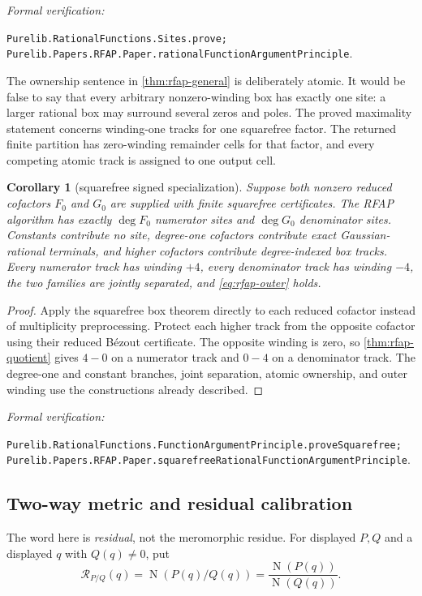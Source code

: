 \documentclass[11pt]{article}
\newtheorem{corollary}[theorem]{Corollary}
\newcommand{\Norm}[1]{\operatorname{N}\!\left(#1\right)}
\newcommand{\leanref}[1]{\par\smallskip\noindent
  \emph{Formal verification:}\par\nobreak
  {\raggedright\nolinkurl{#1}.\par}}
\begin{document}
\leanref{Purelib.RationalFunctions.Sites.prove;
Purelib.Papers.RFAP.Paper.rationalFunctionArgumentPrinciple}

The ownership sentence in \cref{thm:rfap-general} is deliberately atomic.
It would be false to say that every arbitrary nonzero-winding box has exactly
one site: a larger rational box may surround several zeros and poles.  The
proved maximality statement concerns winding-one tracks for one squarefree
factor.  The returned finite partition has zero-winding remainder cells for
that factor, and every competing atomic track is assigned to one output cell.

\begin{corollary}[squarefree signed specialization]
\label{cor:rfap-squarefree}
Suppose both nonzero reduced cofactors $F_0$ and $G_0$ are supplied with
finite squarefree certificates.  The RFAP algorithm has exactly $\deg F_0$
numerator sites and $\deg G_0$ denominator sites.  Constants contribute no
site, degree-one cofactors contribute exact Gaussian-rational terminals, and
higher cofactors contribute degree-indexed box tracks.  Every numerator
track has winding $+4$, every denominator track has winding $-4$, the two
families are jointly separated, and \eqref{eq:rfap-outer} holds.
\end{corollary}

\begin{proof}
Apply the squarefree box theorem directly to each reduced cofactor instead
of multiplicity preprocessing.  Protect each higher track from the opposite
cofactor using their reduced Bézout certificate.  The opposite winding is
zero, so \cref{thm:rfap-quotient} gives $4-0$ on a numerator track and
$0-4$ on a denominator track.  The degree-one and constant branches, joint separation,
atomic ownership, and outer winding use the constructions already described.
\end{proof}

\leanref{Purelib.RationalFunctions.FunctionArgumentPrinciple.proveSquarefree;
Purelib.Papers.RFAP.Paper.squarefreeRationalFunctionArgumentPrinciple}

\subsection{Two-way metric and residual calibration}

The word here is \emph{residual}, not the meromorphic residue.  For displayed
$P,Q$ and a displayed $q$ with $Q(q)\ne0$, put
\begin{equation}
\label{eq:quotient-residual}
       \mathcal R_{P/Q}(q)=\Norm{P(q)/Q(q)}
       =\frac{\Norm{P(q)}}{\Norm{Q(q)}}.
\end{equation}
\end{document}
